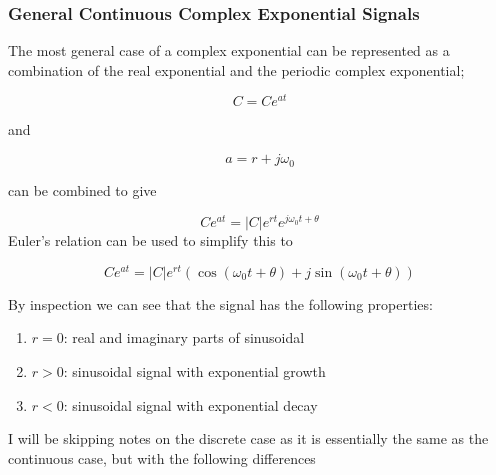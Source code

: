 \documentclass[10pt]{article}
\begin{document}
\subsubsection{General Continuous Complex Exponential Signals}


The most general case of a complex exponential can be represented as a combination of the real exponential and the periodic complex exponential;

\begin{equation}
		C = Ce^{at}
\end{equation}

and

\begin{equation}
	a = r + j\omega_0
\end{equation}

can be combined to give

\begin{definition}
	\begin{equation}
		Ce^{at} = |C|e^{rt}e^{j\omega_0t + \theta}
	\end{equation}
	Euler's relation can be used to simplify this to


	\begin{equation}
		Ce^{at} = |C|e^{rt} \left( \cos(\omega_0t + \theta) + j \sin(\omega_0t + \theta) \right)
	\end{equation}
\end{definition}


By inspection we can see that the signal has the following properties:

\begin{enumerate}
	\item $ r = 0 $: real and imaginary parts of sinusoidal
	\item $ r > 0 $: sinusoidal signal with exponential growth
	\item $ r < 0 $: sinusoidal signal with exponential decay
\end{enumerate}


I will be skipping notes on the discrete case as it is essentially the same as the continuous case, but with the following differences
\end{document}

